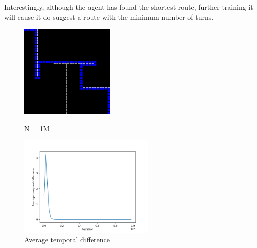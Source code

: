 \documentclass[]{article}
\begin{document}
Interestingly, although the agent has found the shortest route, further training it will cause it do suggest a route with the minimum number of turns. 

\begin{figure}[ht]
	\centering
	\begin{minipage}[c]{0.3\linewidth}
		\includegraphics[width=4.5cm]{1ma}
		\caption{N = 1M}
	\end{minipage}
	\quad
	\begin{minipage}[c]{0.45\linewidth}
		\includegraphics[width=6.5cm]{1mb}
		\caption{Average temporal difference}
	\end{minipage}
\end{figure}
\end{document}
